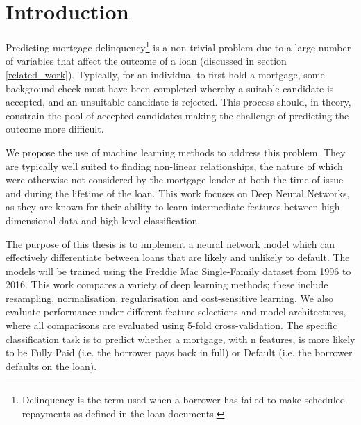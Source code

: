 \chapter{Introduction} \label{chpt: Introduction}

    
    Predicting mortgage delinquency\footnote{Delinquency is the term used when a borrower has failed to make scheduled repayments as defined in the loan documents.} is a non-trivial problem due to a large number of variables that affect the outcome of a loan (discussed in section \ref{related_work}). Typically, for an individual to first hold a mortgage, some background check must have been completed whereby a suitable candidate is accepted, and an unsuitable candidate is rejected. This process should, in theory, constrain the pool of accepted candidates making the challenge of predicting the outcome more difficult. 
    
    We propose the use of machine learning methods to address this problem. They are typically well suited to finding non-linear relationships, the nature of which were otherwise not considered by the mortgage lender at both the time of issue and during the lifetime of the loan. This work focuses on Deep Neural Networks, as they are known for their ability to learn intermediate features between high dimensional data and high-level classification. 
    
    
    The purpose of this thesis is to implement a neural network model which can effectively differentiate between loans that are likely and unlikely to default. The models will be trained using the Freddie Mac Single-Family dataset from 1996 to 2016. This work compares a variety of deep learning methods; these include resampling, normalisation, regularisation and cost-sensitive learning. We also evaluate performance under different feature selections and model architectures, where all comparisons are evaluated using 5-fold cross-validation. The specific classification task is to predict whether a mortgage, with n features, is more likely to be Fully Paid (i.e. the borrower pays back in full) or Default (i.e. the borrower defaults on the loan). 
    

